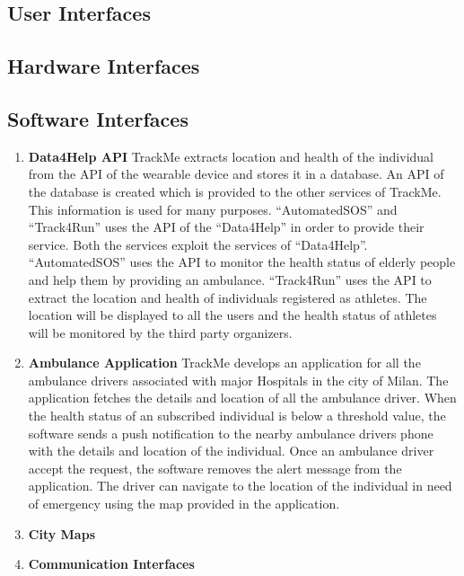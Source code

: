 \subsection{User Interfaces}


\subsection{Hardware Interfaces}


\subsection{Software Interfaces}
\begin{enumerate}
\item \textbf{Data4Help API}
\newline \qquad TrackMe extracts location and health of the individual from the API of the   wearable device and stores it in a database. An API of the database is created which is provided to the other services of TrackMe. This information is used for many purposes. “AutomatedSOS” and “Track4Run” uses the API of the “Data4Help” in order to provide their service. Both the services exploit the services of “Data4Help”. “AutomatedSOS” uses the API to monitor the health status of elderly people and help them by providing an ambulance. “Track4Run” uses the API to extract the location and health of individuals registered as athletes. The location will be displayed to all the users and the health status of athletes will be monitored by the third party organizers.
\item \textbf{Ambulance Application}
\newline\qquad TrackMe develops an application for all the ambulance drivers associated with major Hospitals in the city of Milan. The application fetches the details and location of all the ambulance driver. When the health status of an subscribed individual is below a threshold value, the software sends a push notification to the nearby ambulance drivers phone with the details and location of the individual. Once an ambulance driver accept the request, the software removes the alert message from the application. The driver can navigate to the location of the individual in need of emergency using the map provided in the application.
\item \textbf{City Maps}
\item \textbf{Communication Interfaces}
\end{enumerate}